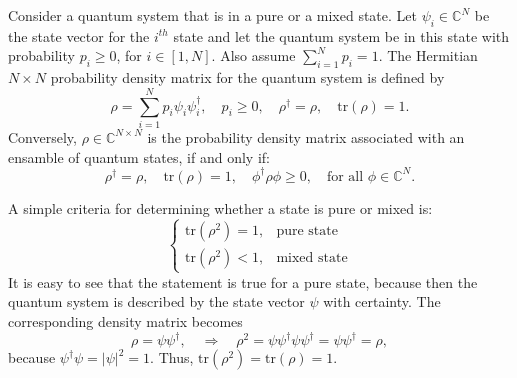 \documentclass[11pt]{article}
\begin{document}
\begin{definition}
  Consider a quantum system that is in a pure or a mixed state. Let $\psi_i\in{\mathbb C}^N$ be the
  state vector for the $i^{th}$ state and let the quantum system be in this state with probability
  $p_i\geq 0$, for $i\in[1,N]$. Also assume $\sum_{i=1}^N p_i = 1$. The Hermitian $N\times N$ probability density matrix
  for the quantum system is defined by
  \[
  \rho = \sum_{i=1}^N p_i \psi_i \psi_i^\dag,\quad p_i \geq 0,\quad \rho^\dag = \rho,\quad \mbox{tr$(\rho)$} = 1.
  \]
  Conversely, $\rho\in{\mathbb C}^{N\times N}$ is the probability density matrix associated with an ensamble of
  quantum states, if and only if:
  \[
  \rho^\dag = \rho,\quad \mbox{tr$(\rho)$} = 1,\quad
  \phi^\dag \rho \phi \geq 0,\quad \mbox{for all $\phi\in {\mathbb C}^N$}.
  \]
\end{definition}
%
A simple criteria for determining whether a state is pure or mixed is:
\[
\begin{cases} \mbox{tr$(\rho^2)= 1$},&\mbox{pure state}\\  \mbox{tr$(\rho^2)< 1$},&\mbox{mixed state} \end{cases}
\]
It is easy to see that the statement is true for a pure state, because then the quantum system is
described by the state vector $\psi$ with certainty. The corresponding density matrix becomes
\[
\rho = \psi \psi^\dag,\quad \Rightarrow \quad \rho^2 = \psi \psi^\dag \psi \psi^\dag = \psi \psi^\dag = \rho,
\]
because $\psi^\dag \psi = |\psi|^2 = 1$. Thus, $\mbox{tr$(\rho^2)$} = \mbox{tr$(\rho)= 1$}$.
\end{document}
